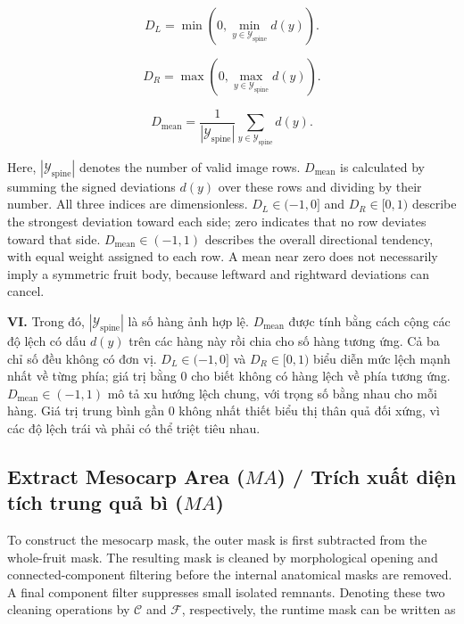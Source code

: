 \documentclass[final,1p,11pt,longtitle]{elsarticle}
\newenvironment{viet}{\par\smallskip\begingroup\color{viColor}\noindent\textbf{VI. }\ignorespaces}{\par\endgroup\smallskip}
\begin{document}
\begin{equation}
D_L=\min\!\left(0,\min_{y\in\mathcal{Y}_{\mathrm{spine}}}d(y)\right).
\end{equation}

\begin{equation}
D_R=\max\!\left(0,\max_{y\in\mathcal{Y}_{\mathrm{spine}}}d(y)\right).
\end{equation}

\begin{equation}
D_{\mathrm{mean}}=\frac{1}{|\mathcal{Y}_{\mathrm{spine}}|}\sum_{y\in\mathcal{Y}_{\mathrm{spine}}}d(y).
\end{equation}

Here, $|\mathcal{Y}_{\mathrm{spine}}|$ denotes the number of valid image rows. $D_{\mathrm{mean}}$ is calculated by summing the signed deviations $d(y)$ over these rows and dividing by their number. All three indices are dimensionless. $D_L\in(-1,0]$ and $D_R\in[0,1)$ describe the strongest deviation toward each side; zero indicates that no row deviates toward that side. $D_{\mathrm{mean}}\in(-1,1)$ describes the overall directional tendency, with equal weight assigned to each row. A mean near zero does not necessarily imply a symmetric fruit body, because leftward and rightward deviations can cancel.

\begin{viet}
Trong đó, $|\mathcal{Y}_{\mathrm{spine}}|$ là số hàng ảnh hợp lệ. $D_{\mathrm{mean}}$ được tính bằng cách cộng các độ lệch có dấu $d(y)$ trên các hàng này rồi chia cho số hàng tương ứng. Cả ba chỉ số đều không có đơn vị. $D_L\in(-1,0]$ và $D_R\in[0,1)$ biểu diễn mức lệch mạnh nhất về từng phía; giá trị bằng 0 cho biết không có hàng lệch về phía tương ứng. $D_{\mathrm{mean}}\in(-1,1)$ mô tả xu hướng lệch chung, với trọng số bằng nhau cho mỗi hàng. Giá trị trung bình gần 0 không nhất thiết biểu thị thân quả đối xứng, vì các độ lệch trái và phải có thể triệt tiêu nhau.
\end{viet}

\subsection*{Extract Mesocarp Area ($MA$) / {\color{viColor} Trích xuất diện tích trung quả bì ($MA$)}}

To construct the mesocarp mask, the outer mask is first subtracted from the whole-fruit mask. The resulting mask is cleaned by morphological opening and connected-component filtering before the internal anatomical masks are removed. A final component filter suppresses small isolated remnants. Denoting these two cleaning operations by $\mathcal{C}$ and $\mathcal{F}$, respectively, the runtime mask can be written as
\end{document}
